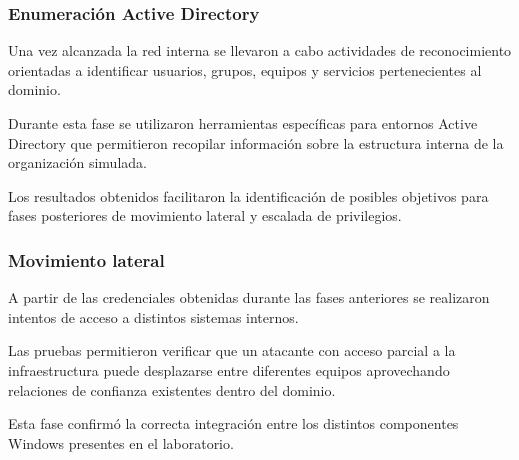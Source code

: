 

\subsubsection{Enumeración Active Directory}

Una vez alcanzada la red interna se llevaron a cabo actividades de reconocimiento orientadas a identificar usuarios, grupos, equipos y servicios pertenecientes al dominio.

Durante esta fase se utilizaron herramientas específicas para entornos Active Directory que permitieron recopilar información sobre la estructura interna de la organización simulada.

Los resultados obtenidos facilitaron la identificación de posibles objetivos para fases posteriores de movimiento lateral y escalada de privilegios.

%


\subsubsection{Movimiento lateral}

A partir de las credenciales obtenidas durante las fases anteriores se realizaron intentos de acceso a distintos sistemas internos.

Las pruebas permitieron verificar que un atacante con acceso parcial a la infraestructura puede desplazarse entre diferentes equipos aprovechando relaciones de confianza existentes dentro del dominio.

Esta fase confirmó la correcta integración entre los distintos componentes Windows presentes en el laboratorio.

%

